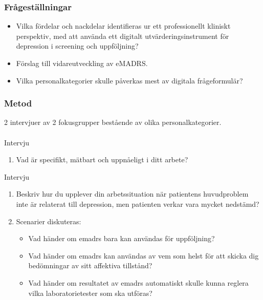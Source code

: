 \documentclass[english]{beamer}
\begin{document}
\begin{frame}
\frametitle{Fr{\aa}gest{\"a}llningar}
	\begin{itemize}
	\item Vilka f{\"o}rdelar och nackdelar identifieras ur ett professionellt kliniskt perspektiv, med att anv{\"a}nda ett digitalt utv{\"a}rderingsinstrument f{\"o}r depression i screening och uppf{\"o}ljning?
	\item F{\"o}rslag till vidareutveckling av eMADRS.
	\item Vilka personalkategorier skulle p{\aa}verkas mest av digitala fr{\aa}geformul{\"a}r?
	\end{itemize}
\end{frame}

\begin{frame}
\frametitle{Metod}
2 intervjuer av 2 fokusgrupper best{\aa}ende av olika personalkategorier.\\\ \\
Intervju {}%
\begin{enumerate}
\item {\bf} Vad {\"a}r specifikt, m{\"a}tbart och uppn{\aa}eligt i ditt arbete?
\end{enumerate}
Intervju {}%
\begin{enumerate}
\item {\bf} Beskriv hur du upplever din arbetssituation n{\"a}r patientens huvudproblem inte {\"a}r relaterat till depression, men patienten verkar vara mycket nedst{\"a}md?\vspace{-.33em}
\item {\bf} Scenarier diskuteras:%
\begin{itemize}%
\item {\bf} Vad h{\"a}nder om e{\sc madrs} bara kan anv{\"a}ndas f{\"or} uppf{\"o}ljning?%
\item {\bf} Vad h{\"a}nder om e{\sc madrs} kan anv{\"a}ndas av vem som helst f{\"o}r att skicka dig bed{\"o}mningar av sitt affektiva tillst{\aa}nd?%
\item {\bf} Vad h{\"a}nder om resultatet av e{\sc madrs} automatiskt skulle kunna reglera vilka laboratorietester som ska utf{\"o}ras?
\end{itemize}
\end{enumerate}
\end{frame}
\end{document}
